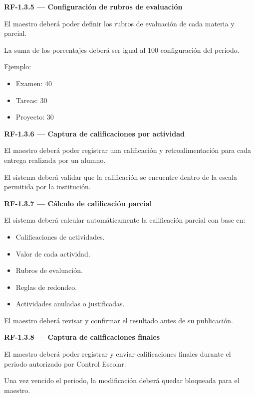 \documentclass[12pt,a4paper]{article}
\newcommand{\RF}[1]{\textbf{\color{primary}RF-#1}}
\newenvironment{requisito}[1]
{
\begin{center}
\begin{minipage}{0.96\textwidth}
\colorbox{requirement}{
\begin{minipage}{0.94\textwidth}
\textbf{#1}
\end{minipage}
}
\vspace{2mm}
}
{
\end{minipage}
\end{center}
}
\begin{document}
\begin{requisito}{\RF{1.3.5} --- Configuración de rubros de evaluación}
El maestro deberá poder definir los rubros de evaluación de cada materia y
parcial.

La suma de los porcentajes deberá ser igual al 100%
configuración del periodo.

Ejemplo:

\begin{itemize}[leftmargin=*]
\item Examen: 40%
\item Tareas: 30%
\item Proyecto: 30%
\end{itemize}
\end{requisito}

\begin{requisito}{\RF{1.3.6} --- Captura de calificaciones por actividad}
El maestro deberá poder registrar una calificación y retroalimentación para cada
entrega realizada por un alumno.

El sistema deberá validar que la calificación se encuentre dentro de la escala
permitida por la institución.
\end{requisito}

\begin{requisito}{\RF{1.3.7} --- Cálculo de calificación parcial}
El sistema deberá calcular automáticamente la calificación parcial con base en:

\begin{itemize}[leftmargin=*]
\item Calificaciones de actividades.
\item Valor de cada actividad.
\item Rubros de evaluación.
\item Reglas de redondeo.
\item Actividades anuladas o justificadas.
\end{itemize}

El maestro deberá revisar y confirmar el resultado antes de su publicación.
\end{requisito}

\begin{requisito}{\RF{1.3.8} --- Captura de calificaciones finales}
El maestro deberá poder registrar y enviar calificaciones finales durante el
periodo autorizado por Control Escolar.

Una vez vencido el periodo, la modificación deberá quedar bloqueada para el
maestro.
\end{requisito}
\end{document}
